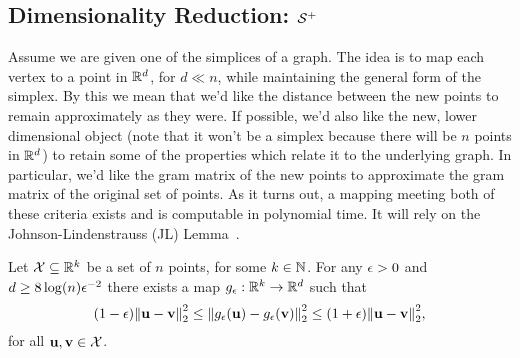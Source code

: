 \subsection{Dimensionality  Reduction: \texorpdfstring{$\mathcal{S}^+$}{the inverse simplex}}
\label{sec:algorithmics_JL}
Assume we are given one of the simplices of a  graph.  
The idea is to  map each vertex to a  point in $\mathbb{R}^d$, for $d\ll n$, while maintaining the general form of the simplex. By this we mean that we'd like the distance between the new  points  to remain approximately  as they  were. If possible, we'd also  like the new, lower  dimensional  object (note that it won't  be  a simplex because there will  be  $n$ points in $ \mathbb{R}^d$) to retain some of the properties which  relate it  to the underlying graph. In  particular, we'd like the gram matrix  of the new  points to  approximate the gram  matrix of the original  set  of points. As it turns out,  a  mapping meeting both  of these criteria exists and is computable  in polynomial time. It will   rely on the Johnson-Lindenstrauss  (JL) Lemma~\cite{johnson1984extensions,dasgupta2003elementary}. 

\begin{theorem}
	Let $\mathcal{X}\subseteq \mathbb{R}^k$ be a set of $n$ points, for some $k\in\mathbb{N}$. For any $\epsilon>0$ and $d\geq 8\log(n)\epsilon^{-2}$ there exists a map $g_\epsilon:\mathbb{R}^k\to\mathbb{R}^d$ such that 
	\begin{equation*}
	(1-\epsilon)\norm{\vb{u}-\vb{v}}_2^2 \leq \norm{g_\epsilon(\vb{u}) - g_\epsilon(\vb{v})}_2^2 \leq (1+\epsilon)\norm{\vb{u}-\vb{v}}_2^2,
	\end{equation*}
	for all $\vb{u},\vb{v}\in \mathcal{X}$. 
\end{theorem}



